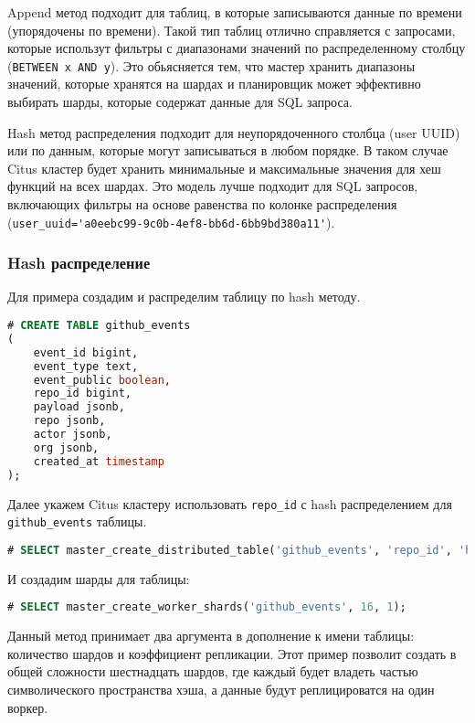 Append метод подходит для таблиц, в которые записываются данные по времени (упорядочены по времени). Такой тип таблиц отлично справляется с запросами, которые использут фильтры с диапазонами значений по распределенному столбцу (\lstinline!BETWEEN x AND y!). Это обьясняется тем, что мастер хранить диапазоны значений, которые хранятся на шардах и планировщик может эффективно выбирать шарды, которые содержат данные для SQL запроса.

Hash метод распределения подходит для неупорядоченного столбца (user UUID) или по данным, которые могут записываться в любом порядке. В таком случае Citus кластер будет хранить минимальные и максимальные значения для хеш функций на всех шардах. Это модель лучше подходит для SQL запросов, включающих фильтры на основе равенства по колонке распределения (\lstinline!user_uuid='a0eebc99-9c0b-4ef8-bb6d-6bb9bd380a11'!).


\subsubsection{Hash распределение}

Для примера создадим и распределим таблицу по hash методу.

\begin{lstlisting}[language=SQL,label=lst:citus_hash1,caption=Создание таблицы]
# CREATE TABLE github_events
(
    event_id bigint,
    event_type text,
    event_public boolean,
    repo_id bigint,
    payload jsonb,
    repo jsonb,
    actor jsonb,
    org jsonb,
    created_at timestamp
);
\end{lstlisting}

Далее укажем Citus кластеру использовать \lstinline!repo_id! с hash распределением для \lstinline!github_events! таблицы.

\begin{lstlisting}[language=SQL,label=lst:citus_hash2,caption=Создание hash распределения]
# SELECT master_create_distributed_table('github_events', 'repo_id', 'hash');
\end{lstlisting}

И создадим шарды для таблицы:

\begin{lstlisting}[language=SQL,label=lst:citus_hash2,caption=Создание шардов]
# SELECT master_create_worker_shards('github_events', 16, 1);
\end{lstlisting}

Данный метод принимает два аргумента в дополнение к имени таблицы: количество шардов и коэффициент репликации. Этот пример позволит создать в общей сложности шестнадцать шардов, где каждый будет владеть частью символического пространства хэша, а данные будут реплицироватся на один воркер.

